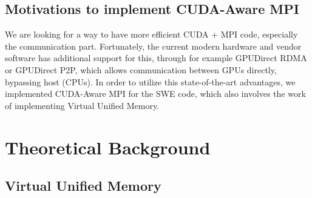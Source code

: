 \documentclass[article]{scrartcl}
\begin{document}
\subsection{Motivations to implement CUDA-Aware MPI}
We are looking for a way to have more efficient CUDA + MPI code, especially the communication part. Fortunately, the current modern hardware and vendor software has additional support for this, through for example GPUDirect RDMA or GPUDirect P2P, which allows communication between GPUs directly, bypassing host (CPUs). In order to utilize this state-of-the-art advantages, we implemented CUDA-Aware MPI for the SWE code, which also involves the work of implementing Virtual Unified Memory.


\section{Theoretical Background}


\subsection{Virtual Unified Memory}


\end{document}
